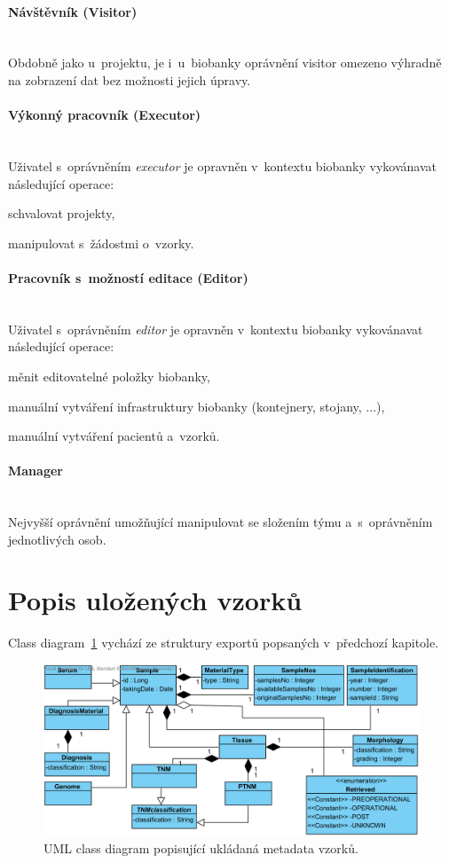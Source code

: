 \documentclass[11pt, final, oneside]{fithesis2}
\newcommand{\paragraphNewLine}[1]{\paragraph*{#1}\mbox{}\\}
\begin{document}
\paragraphNewLine{Návštěvník (Visitor)} 
Obdobně jako u~projektu, je i~u~biobanky oprávnění visitor omezeno výhradně na zobrazení dat bez možnosti jejich úpravy. 

\paragraphNewLine{Výkonný pracovník (Executor)}
Uživatel s~oprávněním \textit{executor} je opravněn v~kontextu biobanky vykovánavat následující operace:
\begin{compactitem}
	\item schvalovat projekty,
	\item manipulovat s~žádostmi o~vzorky.
\end{compactitem}

\paragraphNewLine{Pracovník s~možností editace (Editor)} 
Uživatel s~oprávněním \textit{editor} je opravněn v~kontextu biobanky vykovánavat následující operace:
\begin{compactitem}
	\item měnit editovatelné položky biobanky,
	\item manuální vytváření infrastruktury biobanky (kontejnery, stojany, ...),
	\item manuální vytváření pacientů a~vzorků.
\end{compactitem}

\paragraphNewLine{Manager}
Nejvyšší oprávnění umožňující manipulovat se složením týmu a~s~oprávněním jednotlivých osob.

\section{Popis uložených vzorků}
Class diagram~\ref{fig:index:uml:class:sample} vychází ze struktury exportů popsaných v~předchozí kapitole.

\begin{figure}[h!]
\begin{center}
	\includegraphics[width=\textwidth]{SampleView}
\caption{UML class diagram popisující ukládaná metadata vzorků.}
\label{fig:index:uml:class:sample}
\end{center}
\end{figure}
\end{document}
